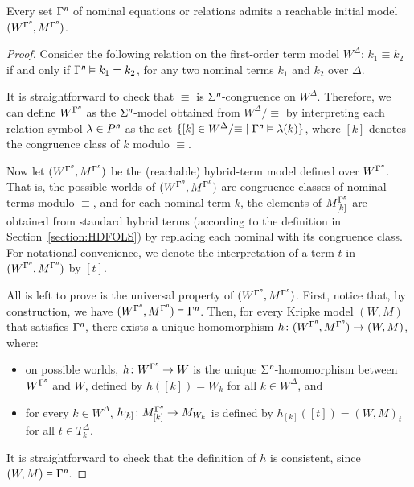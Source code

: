 \documentclass[a4paper,UKenglish,cleveref,autoref]{lipics-v2019}
\begin{document}
\begin{proposition}
  \label{proposition:HDCLSn-initiality}
  Every set\/ $\Gamma^{\text{\normalfont\sffamily\itshape n}}$ of nominal equations or relations admits a reachable initial model $(W^{\Gamma^{\text{\normalfont\sffamily\itshape n}}}, M^{\Gamma^{\text{\normalfont\sffamily\itshape n}}})$.
\end{proposition}
\begin{proof}
  Consider the following relation on the first-order term model $W^\Delta $:
  $k_{1} \equiv k_{2}$ if and only if $\Gamma^{\text{\normalfont\sffamily\itshape n}} \vDash k_{1} = k_{2}$, for any two nominal terms $k_{1}$ and $k_{2}$ over $\Delta$.

  It is straightforward to check that $\equiv$ is $\Sigma^{\text{\normalfont\sffamily\itshape n}}$-congruence on $W^\Delta $.
  Therefore, we can define $W^{\Gamma^{\text{\normalfont\sffamily\itshape n}}}$ as the $\Sigma^{\text{\normalfont\sffamily\itshape n}}$-model obtained from $W^\Delta  /{\equiv}$ by interpreting each relation symbol $\lambda \in P^{\text{\normalfont\sffamily\itshape n}}$ as the set $\{ [k] \in W^\Delta  /{\equiv} \mid \Gamma^{\text{\normalfont\sffamily\itshape n}} \vDash \lambda(k) \}$, where $[k]$ denotes the congruence class of $k$ modulo $\equiv$.

  Now let $(W^{\Gamma^{\text{\normalfont\sffamily\itshape n}}}, M^{\Gamma^{\text{\normalfont\sffamily\itshape n}}})$ be the (reachable) hybrid-term model defined over $W^{\Gamma^{\text{\normalfont\sffamily\itshape n}}}$.
  That is, the possible worlds of $(W^{\Gamma^{\text{\normalfont\sffamily\itshape n}}}, M^{\Gamma^{\text{\normalfont\sffamily\itshape n}}})$ are congruence classes of nominal terms modulo $\equiv$, and for each nominal term $k$, the elements of $M^{\Gamma^{\text{\normalfont\sffamily\itshape n}}}_{[k]}$ are obtained from standard hybrid terms (according to the definition in Section~\ref{section:HDFOLS}) by replacing each nominal with its congruence class.
  For notational convenience, we denote the interpretation of a term $t$ in $(W^{\Gamma^{\text{\normalfont\sffamily\itshape n}}}, M^{\Gamma^{\text{\normalfont\sffamily\itshape n}}})$ by $[t]$.

  All is left to prove is the universal property of $(W^{\Gamma^{\text{\normalfont\sffamily\itshape n}}}, M^{\Gamma^{\text{\normalfont\sffamily\itshape n}}})$.
  First, notice that, by construction, we have $(W^{\Gamma^{\text{\normalfont\sffamily\itshape n}}}, M^{\Gamma^{\text{\normalfont\sffamily\itshape n}}}) \vDash \Gamma^{\text{\normalfont\sffamily\itshape n}}$.
  Then, for every Kripke model $(W, M)$ that satisfies $\Gamma^{\text{\normalfont\sffamily\itshape n}}$, there exists a unique homomorphism $h \colon (W^{\Gamma^{\text{\normalfont\sffamily\itshape n}}}, M^{\Gamma^{\text{\normalfont\sffamily\itshape n}}}) \to (W, M)$, where:
  \begin{itemize}
  \item on possible worlds, $h \colon W^{\Gamma^{\text{\normalfont\sffamily\itshape n}}} \to W$ is the unique $\Sigma^{\text{\normalfont\sffamily\itshape n}}$-homomorphism between $W^{\Gamma^{\text{\normalfont\sffamily\itshape n}}}$ and $W$, defined by $h([k]) = W_{k}$ for all $k \in W^\Delta $, and 

  \item for every $k \in W^\Delta $, $h_{[k]} \colon M^{\Gamma^{\text{\normalfont\sffamily\itshape n}}}_{[k]} \to M_{W_{k}}$ is defined by $h_{[k]}([t]) = (W, M)_{t}$ for all $t \in T^{\Delta}_{k}$.
  \end{itemize}
  It is straightforward to check that the definition of $h$ is consistent, since $(W, M) \vDash \Gamma^{\text{\normalfont\sffamily\itshape n}}$.
\end{proof}
\end{document}
